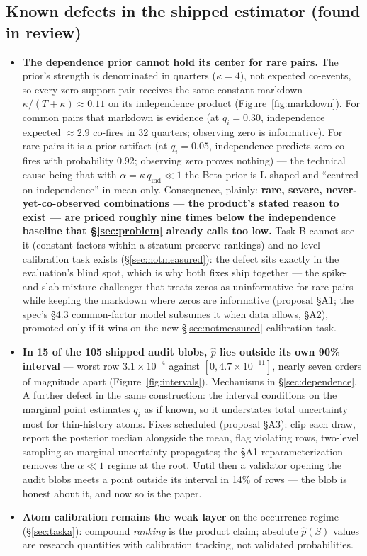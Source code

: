 \documentclass[11pt]{article}
\begin{document}
\subsection{Known defects in the shipped estimator (found in review)}
\label{sec:defects}

\begin{itemize}[leftmargin=1.4em]
\item \textbf{The dependence prior cannot hold its center for rare pairs.}
  The prior's strength is denominated in quarters ($\kappa = 4$), not
  expected co-events, so every zero-support pair receives the same constant
  markdown $\kappa/(T+\kappa) \approx 0.11$ on its independence product
  (Figure~\ref{fig:markdown}). For common pairs that markdown is evidence
  (at $q_i = 0.30$, independence expected $\approx 2.9$ co-fires in 32
  quarters; observing zero is informative). For rare pairs it is a prior
  artifact (at $q_i = 0.05$, independence predicts zero co-fires with
  probability 0.92; observing zero proves nothing) --- the technical cause
  being that with $\alpha = \kappa\, q_{\mathrm{ind}} \ll 1$ the Beta prior
  is L-shaped and ``centred on independence'' in mean only. Consequence,
  plainly: \textbf{rare, severe, never-yet-co-observed combinations --- the
  product's stated reason to exist --- are priced roughly nine times below
  the independence baseline that \S\ref{sec:problem} already calls too
  low.} Task B cannot see it (constant factors within a stratum preserve
  rankings) and no level-calibration task exists
  (\S\ref{sec:notmeasured}): the defect sits exactly in the evaluation's
  blind spot, which is why both fixes ship together --- the spike-and-slab
  mixture challenger that treats zeros as uninformative for rare pairs
  while keeping the markdown where zeros are informative (proposal \S A1;
  the spec's \S4.3 common-factor model subsumes it when data allows,
  \S A2), promoted only if it wins on the new \S\ref{sec:notmeasured}
  calibration task.
\item \textbf{In 15 of the 105 shipped audit blobs, $\hat p$ lies outside
  its own 90\% interval} --- worst row $3.1\times10^{-4}$ against
  $[0, 4.7\times10^{-11}]$, nearly seven orders of magnitude apart
  (Figure~\ref{fig:intervals}). Mechanisms in \S\ref{sec:dependence}. A
  further defect in the same construction: the interval conditions on the
  marginal point estimates $q_i$ as if known, so it understates total
  uncertainty most for thin-history atoms. Fixes scheduled (proposal
  \S A3): clip each draw, report the posterior median alongside the mean,
  flag violating rows, two-level sampling so marginal uncertainty
  propagates; the \S A1 reparameterization removes the $\alpha \ll 1$
  regime at the root. Until then a validator opening the audit blobs meets
  a point outside its interval in 14\% of rows --- the blob is honest about
  it, and now so is the paper.
\item \textbf{Atom calibration remains the weak layer} on the occurrence
  regime (\S\ref{sec:taska}): compound \emph{ranking} is the product claim;
  absolute $\hat p(S)$ values are research quantities with calibration
  tracking, not validated probabilities.
\end{itemize}
\end{document}
